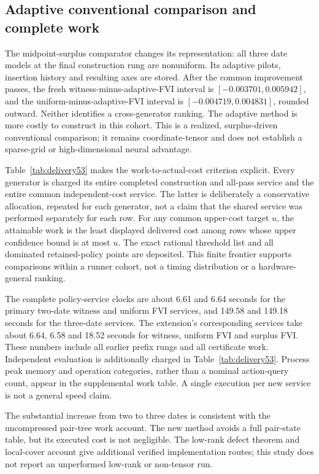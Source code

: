 \subsection{Adaptive conventional comparison and complete work}

The midpoint-surplus comparator changes its representation: all three date models at the final construction rung are nonuniform. Its adaptive pilots, insertion history and resulting axes are stored. After the common improvement passes, the fresh witness-minus-adaptive-FVI interval is $[-0.003701,0.005942]$, and the uniform-minus-adaptive-FVI interval is $[-0.004719,0.004831]$, rounded outward. Neither identifies a cross-generator ranking. The adaptive method is more costly to construct in this cohort. This is a realized, surplus-driven conventional comparison; it remains coordinate-tensor and does not establish a sparse-grid or high-dimensional neural advantage.


Table~\ref{tab:delivery53} makes the work-to-actual-cost criterion explicit. Every generator is charged its entire completed construction and all-pass service and the entire common independent-cost service. The latter is deliberately a conservative allocation, repeated for each generator, not a claim that the shared service was performed separately for each row. For any common upper-cost target $u$, the attainable work is the least displayed delivered cost among rows whose upper confidence bound is at most $u$. The exact rational threshold list and all dominated retained-policy points are deposited. This finite frontier supports comparisons within a runner cohort, not a timing distribution or a hardware-general ranking.

The complete policy-service clocks are about 6.61 and 6.64 seconds for the primary two-date witness and uniform FVI services, and 149.58 and 149.18 seconds for the three-date services. The extension's corresponding services take about 6.64, 6.58 and 18.52 seconds for witness, uniform FVI and surplus FVI. These numbers include all earlier prefix rungs and all certificate work. Independent evaluation is additionally charged in Table~\ref{tab:delivery53}. Process peak memory and operation categories, rather than a nominal action-query count, appear in the supplemental work table. A single execution per new service is not a general speed claim.

The substantial increase from two to three dates is consistent with the uncompressed pair-tree work account. The new method avoids a full pair-state table, but its executed cost is not negligible. The low-rank defect theorem and local-cover account give additional verified implementation routes; this study does not report an unperformed low-rank or non-tensor run.

